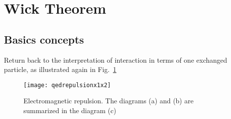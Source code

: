 
\section{Wick Theorem}
\label{sec:wick-theorem}

\subsection{Basics concepts}
Return back to  the interpretation of interaction in terms of one exchanged particle, as illustrated again in Fig.~\ref{fig:qedrepulsionx1x2}
\begin{figure}
  \centering
  \texttt{[image: qedrepulsionx1x2]}
  \caption{Electromagnetic repulsion. The diagrams (a) and (b) are summarized in the diagram (c)}
  \label{fig:qedrepulsionx1x2}
\end{figure}


